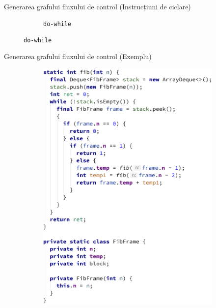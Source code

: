 \documentclass{beamer}
\def\code#1{\texttt{#1}}
\begin{document}
\begin{frame}{Generarea grafului fluxului de control (Instrucțiuni de ciclare)}
\begin{figure}[htb]
\begin{subfigure}[b]{0.32\textwidth}
            \caption{\code{do-while}}
        \end{subfigure}
    \end{figure}
\end{frame}

\begin{frame}{Generarea grafului fluxului de control (Exemplu)}
    \begin{figure}[htb]
        \begin{subfigure}[b]{.4\textwidth}
            \centering
            \includegraphics[width=\textwidth]{../../../theses/diploma/src/img/cfg-before-white-32.png}
        \end{subfigure}
        \begin{subfigure}[b]{.4\textwidth}
            \centering

\end{subfigure}
\end{figure}
\end{frame}
\end{document}
